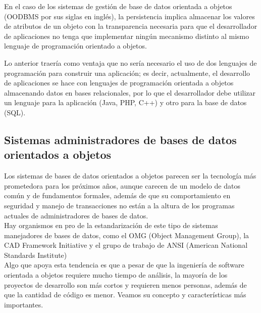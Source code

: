 \documentclass[12pts, A3 ,twosides]{article}
\begin{document}
En el caso de los sistemas de gestión de base de datos orientada a objetos (OODBMS por sus siglas en inglés), la persistencia implica almacenar los valores de atributos de un objeto con la transparencia necesaria para que el desarrollador de aplicaciones no tenga que implementar ningún mecanismo distinto al mismo lenguaje de programación orientado a objetos. 

Lo anterior traería como ventaja que no sería necesario el uso de dos lenguajes de programación para construir una aplicación; es decir, actualmente, el desarrollo de aplicaciones se hace con lenguajes de programación orientada a objetos almacenando datos en bases relacionales, por lo que el desarrollador debe utilizar un lenguaje para la aplicación (Java, PHP, C++) y otro para la base de datos (SQL). 

\subsection{Sistemas administradores de bases de datos orientados a objetos}
Los sistemas de bases de datos orientados a objetos parecen ser la tecnología más prometedora para los próximos años, aunque carecen de un modelo de datos común y de fundamentos formales, además de que su comportamiento en seguridad y manejo de transacciones no están a la altura de los programas actuales de administradores de bases de datos. \\
Hay organismos en pro de la estandarización de este tipo de sistemas manejadores de bases de datos, como el OMG (Object Management Group), la CAD Framework Initiative y el grupo de trabajo de ANSI (American National Standards Institute)\\
Algo que apoya esta tendencia es que a pesar de que la ingeniería de software orientada a objetos requiere mucho tiempo de análisis, la mayoría de los proyectos de desarrollo son más cortos y requieren menos personas, además de que la cantidad de código es menor. Veamos su concepto y características más importantes.
\end{document}
